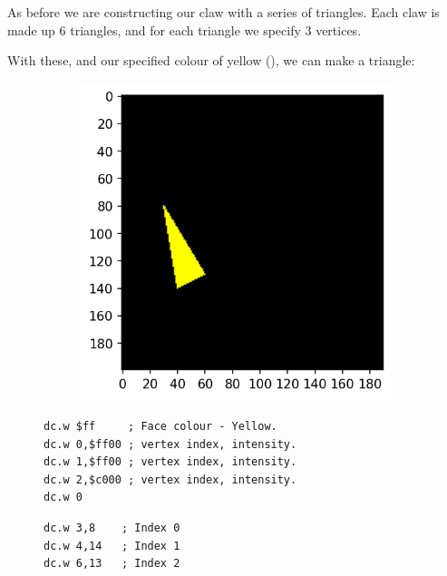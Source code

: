 As before we are constructing our claw with a series of triangles. Each claw
is made up 6 triangles, and for each triangle we specify 3 vertices.

With these, and our specified colour of yellow (), we can make a triangle:

\begin{figure}[H]
  \centering
  \begin{adjustbox}{width=13cm,center}
    \begin{minipage}[c]{0.48\linewidth}
      \begin{figure}[H]
        \centering
        \begin{adjustbox}{width=5.5cm,center}
          \includegraphics[width=12cm]{src/build_t2k_claws/claw_face_1.png}%
        \end{adjustbox}
      \end{figure}
    \end{minipage}
    \begin{minipage}[c]{0.48\linewidth}
      \begin{lstlisting}[basicstyle=\scriptsize\ttfamily]
dc.w $ff     ; Face colour - Yellow.
dc.w 0,$ff00 ; vertex index, intensity.
dc.w 1,$ff00 ; vertex index, intensity.
dc.w 2,$c000 ; vertex index, intensity.
dc.w 0
      \end{lstlisting}
      \begin{lstlisting}[basicstyle=\scriptsize\ttfamily]
dc.w 3,8    ; Index 0
dc.w 4,14   ; Index 1
dc.w 6,13   ; Index 2
      \end{lstlisting}
      \vspace*{\fill}
    \end{minipage}
  \end{adjustbox}
\end{figure}

